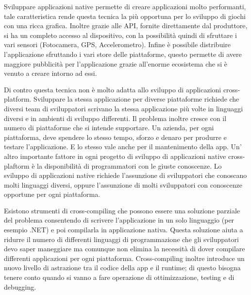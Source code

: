 Sviluppare applicazioni native permette di creare applicazioni molto performanti, tale caratteristica rende questa tecnica la più opportuna per lo sviluppo di giochi con una ricca grafica. Inoltre grazie alle API, fornite direttamente dal produttore, si ha un completo accesso al dispositivo, con la possibilità quindi di sfruttare i vari sensori (Fotocamera, GPS, Accelerometro). Infine è possibile distribuire l'applicazione sfruttando i vari store delle piattaforme, questo permette di avere maggiore pubblicità per l'applicazione grazie all'enorme ecosistema che si è venuto a creare intorno ad essi.

Di contro questa tecnica non è molto adatta allo sviluppo di applicazioni cross-platform. Sviluppare la stessa applicazione per diverse piattaforme richiede che diversi team di sviluppatori scrivano la stessa applicazione più volte in linguaggi diversi e in ambienti di sviluppo differenti.
Il problema inoltre cresce con il numero di piattaforme che si intende supportare. Un azienda, per ogni piattaforma, deve spendere lo stesso tempo, sforzo e denaro per produrre e testare l'applicazione. E lo stesso vale anche per il mantenimento della app.
Un' altro importante fattore in ogni progetto di sviluppo di applicazioni native cross-plaftorm è la disponibilità di programmatori con le giuste conoscenze. Lo sviluppo di applicazioni native richiede l'assunzione di sviluppatori che conoscano molti linguaggi diversi, oppure l'assunzione di molti sviluppatori con conoscenze opportune per ogni piattaforma.
 
Esistono strumenti di cross-compiling che possono essere una soluzione parziale del problema consentendo di scrivere l'applicazione in un solo linguaggio (per esempio .NET) e poi compilarla in applicazione nativa. Questa soluzione aiuta a ridurre il numero di differenti linguaggi di programmazione che gli sviluppatori devo saper maneggiare ma comunque non elimina la necessità di dover compilare differenti applicazioni per ogni piattaforma. Cross-compiling inoltre introduce un nuovo livello di astrazione tra il codice della app e il runtime; di questo bisogna tenere conto quando si vanno a fare operazione di ottimizzazione, testing e di debugging.

